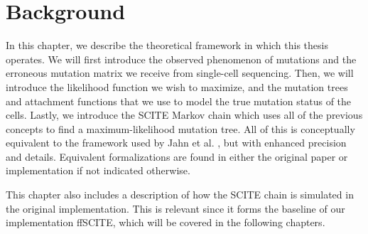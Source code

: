 \chapter{Background}
\label{ch:background}

In this chapter, we describe the theoretical framework in which this thesis operates. We will first introduce the observed phenomenon of mutations and the erroneous mutation matrix we receive from single-cell sequencing. Then, we will introduce the likelihood function we wish to maximize, and the mutation trees and attachment functions that we use to model the true mutation status of the cells. Lastly, we introduce the \ac{SCITE} Markov chain which uses all of the previous concepts to find a maximum-likelihood mutation tree. All of this is conceptually equivalent to the framework used by Jahn et al. \cite{tree2016}, but with enhanced precision and details. Equivalent formalizations are found in either the original paper or implementation if not indicated otherwise.

This chapter also includes a description of how the \ac{SCITE} chain is simulated in the original implementation. This is relevant since it forms the baseline of our implementation \ac{ffSCITE}, which will be covered in the following chapters.


